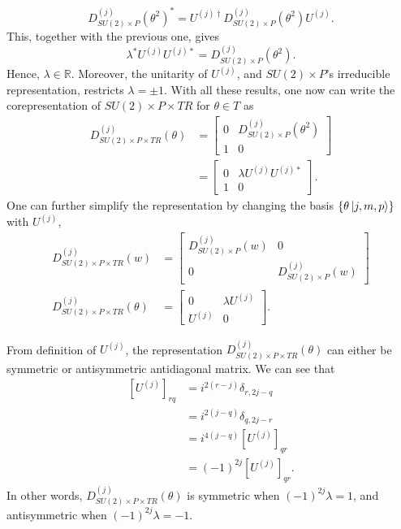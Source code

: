 \documentclass[preprint, 12pt]{revtex4-2}
\numberwithin{equation}{section}
\begin{document}
\begin{equation}
    D^{(j)}_{SU(2)\times P}(\theta^{2})^\ast = U^{(j)\dagger}D^{(j)}_{SU(2)\times P}(\theta^{2})U^{(j)}.
\end{equation}
This, together with the previous one, gives
\begin{equation}
    \lambda^\ast U^{(j)}U^{(j)\ast} = D^{(j)}_{SU(2)\times P}(\theta^{2}).
\end{equation}
Hence, $\lambda\in\mathbb{R}$. Moreover, the unitarity of $U^{(j)}$, and $SU(2)\times P$'s irreducible representation, restricts $\lambda = \pm 1$. With all these results, one now can write the corepresentation of $SU(2)\times P\times TR$ for $\theta\in T$ as
\begin{equation}
    \begin{aligned}
        D_{SU(2)\times P\times TR}^{(j)}(\theta) &= 
        \begin{bmatrix}
            0 & D^{(j)}_{SU(2)\times P}(\theta^2) \\
            1 & 0
        \end{bmatrix} \\
        &= \begin{bmatrix}
            0 & \lambda U^{(j)}U^{(j)\ast} \\
            1 & 0
        \end{bmatrix}.
    \end{aligned}
\end{equation}
One can further simplify the representation by changing the basis $\{\theta\ket{j, m, p}\}$ with $U^{(j)}$,
\begin{equation}
    \begin{aligned}
        D_{SU(2)\times P\times TR}^{(j)}(w) &= 
        \begin{bmatrix}
            D^{(j)}_{SU(2)\times P}(w) & 0 \\
            0 & D^{(j)}_{SU(2)\times P}(w)
        \end{bmatrix} \\
        D_{SU(2)\times P\times TR}^{(j)}(\theta) &= 
        \begin{bmatrix}
            0 & \lambda U^{(j)} \\
            U^{(j)} & 0
        \end{bmatrix}.
    \end{aligned}
\end{equation}

From definition of $U^{(j)}$, the representation $D_{SU(2)\times P\times TR}^{(j)}(\theta)$ can either be symmetric or antisymmetric antidiagonal matrix. We can see that
\begin{equation}
    \begin{aligned}
        \left[U^{(j)}\right]_{rq} &= i^{2(r-j)}\delta_{r,2j-q} \\
        &= i^{2(j-q)}\delta_{q,2j-r} \\
        &= i^{4(j-q)}\left[U^{(j)}\right]_{qr} \\
        &= (-1)^{2j}\left[U^{(j)}\right]_{qr}.
    \end{aligned}
\end{equation}
In other words, $D_{SU(2)\times P\times TR}^{(j)}(\theta)$ is symmetric when $(-1)^{2j}\lambda = 1$, and antisymmetric when $(-1)^{2j}\lambda = -1$. 
\end{document}
